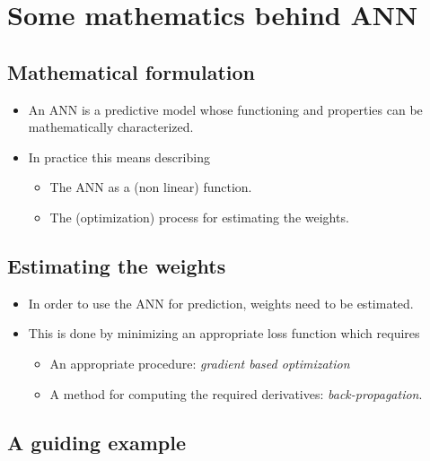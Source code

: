 \documentclass[
  letterpaper,
  DIV=11,
  numbers=noendperiod]{scrartcl}
\providecommand{\tightlist}{%
  \setlength{\itemsep}{0pt}\setlength{\parskip}{0pt}}\usepackage{longtable,booktabs,array}
\begin{document}
\hypertarget{some-mathematics-behind-ann}{%
\section{Some mathematics behind
ANN}\label{some-mathematics-behind-ann}}

\hypertarget{mathematical-formulation}{%
\subsection{Mathematical formulation}\label{mathematical-formulation}}

\begin{itemize}
\item
  An ANN is a predictive model whose functioning and properties can be
  mathematically characterized.
\item
  In practice this means describing

  \begin{itemize}
  \tightlist
  \item
    The ANN as a (non linear) function.
  \item
    The (optimization) process for estimating the weights.
  \end{itemize}
\end{itemize}

\hypertarget{estimating-the-weights}{%
\subsection{Estimating the weights}\label{estimating-the-weights}}

\begin{itemize}
\tightlist
\item
  In order to use the ANN for prediction, weights need to be estimated.
\item
  This is done by minimizing an appropriate loss function which requires

  \begin{itemize}
  \tightlist
  \item
    An appropriate procedure: \emph{gradient based optimization}
  \item
    A method for computing the required derivatives:
    \emph{back-propagation}.
  \end{itemize}
\end{itemize}

\hypertarget{a-guiding-example}{%
\subsection{A guiding example}\label{a-guiding-example}}
\end{document}
